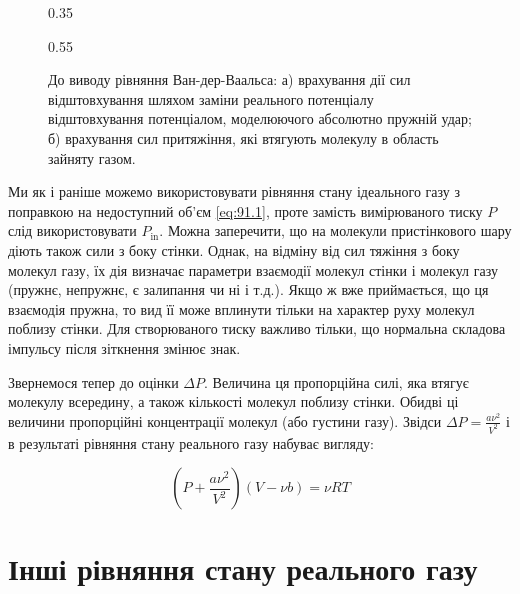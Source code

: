 \begin{figure}[h!]\centering
	\begin{subcaptionblock}[]{0.35\linewidth}\centering
        
		\caption{}
		\label{pic:8.6a}
	\end{subcaptionblock}
	\quad %
	\begin{subcaptionblock}[]{0.55\linewidth}\centering
        
		\caption{}
		\label{pic:8.6b}
	\end{subcaptionblock}
	\caption{До виводу рівняння Ван-дер-Ваальса: а) врахування дії сил відштовхування шляхом заміни реального потенціалу відштовхування потенціалом, моделюючого абсолютно пружній удар; б) врахування сил притяжіння, які втягують молекулу в область зайняту газом.}\label{pic:8.6}
\end{figure}

Ми як і раніше можемо використовувати рівняння стану ідеального газу з поправкою на недоступний об'єм
\eqref{eq:91.1}, проте замість вимірюваного тиску $P$ слід використовувати $P_{\text{in}}$. Можна
заперечити, що на молекули пристінкового шару діють також сили з боку стінки. Однак, на відміну від
сил тяжіння з боку молекул газу, їх дія визначає параметри взаємодії молекул стінки і молекул газу
(пружнє, непружнє, є залипання чи ні і т.д.). Якщо ж вже приймається, що ця взаємодія пружна, то вид
її може вплинути тільки на характер руху молекул поблизу стінки. Для створюваного тиску важливо
тільки, що нормальна складова імпульсу після зіткнення змінює знак.

Звернемося тепер до оцінки $\Delta P$. Величина ця пропорційна силі, яка втягує молекулу всередину, а
також кількості молекул поблизу стінки. Обидві ці величини пропорційні концентрації молекул (або
густини газу). Звідси $\Delta P = \frac{a\nu^2}{V^2}$ і в результаті рівняння стану реального газу набуває вигляду:

\begin{equation}
\left( P + \frac{a\nu^{2}}{V^{2}} \right)(V - \nu b) = \nu RT
\label{eq:91.2}
\end{equation}

\section{Інші рівняння стану реального газу}

